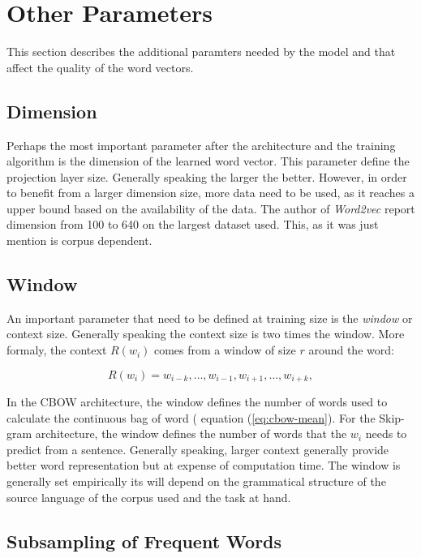\section{Other Parameters}
\label{sec:w2v_other_paramters}
This section describes the additional paramters needed by the model and that
affect the quality of the word vectors.


\subsection{Dimension }
\label{sec:w2v-param-dim}
Perhaps the most important parameter after the architecture and the training
algorithm is the dimension of the learned word vector.  This parameter define
the projection layer size. Generally speaking the larger the better.
However, in order to benefit from a larger dimension size, more data need to
be used, as it  reaches a upper bound based on the availability of the data.
The author of \textit{Word2vec} report dimension from 100 to 640 on the
largest dataset used. This, as it was just mention is corpus dependent.


\subsection{Window}
\label{sec:w2v-params-win}

An important parameter that need to be defined at training size is the
\textit{window} or context size. Generally speaking the context size is two
times the window. More formaly, the context $R(w_i)$ comes from a window of
size $r$ around the word:

\begin{equation*}
R(w_i) =
w_{i-k},\ldots,w_{i-1},w_{i+1},\ldots,w_{i+k},
\end{equation*}

In  the \ac{CBOW} architecture, the window defines the number of words used to
calculate the continuous bag of word ( equation (\ref{eq:cbow-mean}).  For
the Skip-gram architecture, the window defines  the number of words that the
$w_i$ needs to predict from a sentence.  Generally speaking,  larger
context generally provide better word representation but at expense of
computation time. The window  is generally set empirically its  will depend
on the grammatical structure of the source language of the corpus used and the task at hand.


\subsection{Subsampling of Frequent Words}
\label{sec:sub-hs}

